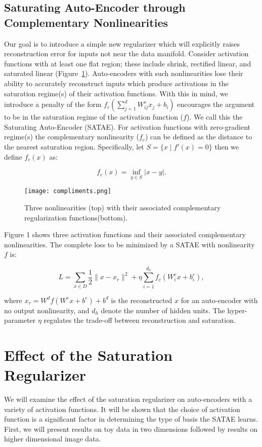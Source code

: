 \documentclass{article} %
\begin{document}
\subsection{Saturating Auto-Encoder through Complementary Nonlinearities}     
Our goal is to introduce a simple new regularizer which will explicitly raises reconstruction error for inputs not near the data manifold. Consider activation functions with at least one flat region; these include shrink, rectified linear, and saturated linear (Figure~\ref{fig:nonlin}). Auto-encoders with such nonlinearities lose their ability to accurately reconstruct inputs which produce activations in the saturation regime(s) of their activation functions. With this in mind, we introduce a penalty of the form $f_c(\sum_{j=1}^d W^e_{ij}x_j + b_i)$ encourages the argument to be in the saturation regime of the activation function ($f$). We call this the Saturating Auto-Encoder (SATAE). For activation functions with zero-gradient regime(s) the complementary nonlinearity ($f_c$) can be defined as the distance to the nearest saturation region. Specifically, let $S = \{x \mid  f'(x) = 0\}$ then we define $f_c(x)$ as: 

\begin{equation}
f_c(x) = \inf_ {y \in S} |x-y|.   
\end{equation}   

\begin{figure}
\centering 
\texttt{[image: compliments.png]}
\caption{Three nonlinearities (top) with their associated complementary regularization functions(bottom).}  
\label{fig:nonlin}
\end{figure} 

\noindent
Figure 1 shows three activation functions and their associated complementary nonlinearities. The complete loss to be minimized by a SATAE with nonlinearity $f$ is: 

\begin{equation} 
L = \sum_{x \in D} \frac{1}{2} \|x-x_r\|^2 + \eta \sum_{i=1}^{d_h}f_c(W^e_i x + b^e_i),
\end{equation}    

\noindent
where $x_r = W^df(W^e x + b^e) + b^d$ is the reconstructed $x$ for an auto-encoder with no output nonlinearity, and $d_h$ denote the number of hidden units. The hyper-parameter $\eta$ regulates the trade-off between reconstruction and saturation.  

\section{Effect of the Saturation Regularizer} 
We will examine the effect of the saturation regularizer on auto-encoders with a variety of activation functions. It will be shown that the choice of activation function is a significant factor in determining the type of basis the SATAE learns. First, we will present results on toy data in two dimensions followed by results on higher dimensional image data. 
\end{document}
